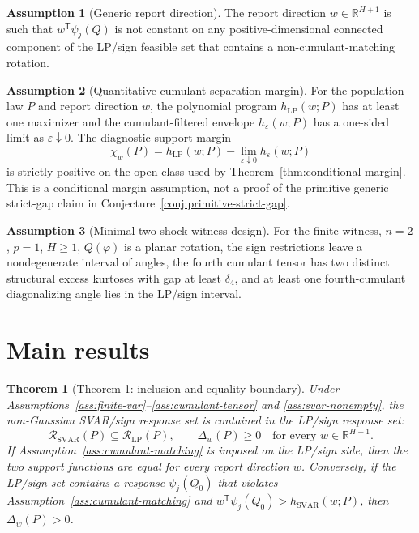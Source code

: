 \documentclass[11pt]{article}
\newcommand{\transpose}{\mathsf{T}}
\newcommand{\R}{\mathbb{R}}
\theoremstyle{definition}
\newtheorem{assumption}{Assumption}
\theoremstyle{plain}
\newtheorem{theorem}{Theorem}
\theoremstyle{remark}
\begin{document}
\begin{assumption}[Generic report direction]\label{ass:generic-report}
The report direction \(w\in\R^{H+1}\) is such that \(w^\transpose\psi_j(Q)\) is not constant on any positive-dimensional connected component of the LP/sign feasible set that contains a non-cumulant-matching rotation.
\end{assumption}

\begin{assumption}[Quantitative cumulant-separation margin]\label{ass:quant-margin}
For the population law \(P\) and report direction \(w\), the polynomial program \(h_{\mathrm{LP}}(w;P)\) has at least one maximizer and the cumulant-filtered envelope \(h_\varepsilon(w;P)\) has a one-sided limit as \(\varepsilon\downarrow0\).  The diagnostic support margin
\[
\chi_w(P)=h_{\mathrm{LP}}(w;P)-\lim_{\varepsilon\downarrow0}h_\varepsilon(w;P)
\]
is strictly positive on the open class used by Theorem~\ref{thm:conditional-margin}.  This is a conditional margin assumption, not a proof of the primitive generic strict-gap claim in Conjecture~\ref{conj:primitive-strict-gap}.
\end{assumption}

\begin{assumption}[Minimal two-shock witness design]\label{ass:two-shock}
For the finite witness, \(n=2\), \(p=1\), \(H\ge1\), \(Q(\varphi)\) is a planar rotation, the sign restrictions leave a nondegenerate interval of angles, the fourth cumulant tensor has two distinct structural excess kurtoses with gap at least \(\delta_4\), and at least one fourth-cumulant diagonalizing angle lies in the LP/sign interval.
\end{assumption}

\section{Main results}
\begin{theorem}[Theorem 1: inclusion and equality boundary]\label{thm:inclusion-boundary}
Under Assumptions~\ref{ass:finite-var}--\ref{ass:cumulant-tensor} and \ref{ass:svar-nonempty}, the non-Gaussian SVAR/sign response set is contained in the LP/sign response set:
\[
\mathcal R_{\mathrm{SVAR}}(P)\subseteq\mathcal R_{\mathrm{LP}}(P),
\qquad
\Delta_w(P)\ge0\quad\text{for every }w\in\R^{H+1}.
\]
If Assumption~\ref{ass:cumulant-matching} is imposed on the LP/sign side, then the two support functions are equal for every report direction \(w\).  Conversely, if the LP/sign set contains a response \(\psi_j(Q_0)\) that violates Assumption~\ref{ass:cumulant-matching}\) and \(w^\transpose\psi_j(Q_0)>h_{\mathrm{SVAR}}(w;P)\), then \(\Delta_w(P)>0\).
\end{theorem}
\end{document}
